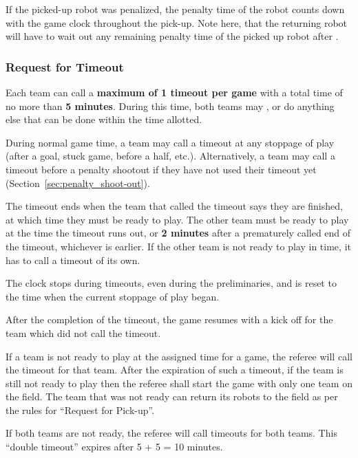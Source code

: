 If the picked-up robot was penalized, the penalty time of the robot counts down with the game clock throughout the pick-up.
Note here, that the returning robot will have to wait out any remaining penalty time of the picked up robot after .

\subsubsection{Request for Timeout}
\label{sec:request_for_timeout}
Each team can call a \textbf{maximum of 1 timeout per game} with a total time of no more than \textbf{5 minutes}. During this time, both teams may , or do anything else that can be done within the time allotted. \\

During normal game time, a team may call a timeout at any stoppage of play (after a goal, stuck game, before a half, etc.). Alternatively, a team may call a timeout before a penalty shootout if they have not used their timeout yet (\cf Section~\ref{sec:penalty_shoot-out}).

The timeout ends when the team that called the timeout says they are finished, at which time they must be ready to play. The other team must be ready to play at the time the timeout runs out, or \textbf{2 minutes} after a prematurely called end of the timeout, whichever is earlier. If the other team is not ready to play in time, it has to call a timeout of its own.

The clock stops during timeouts, even during the preliminaries, and is reset to the time when the current stoppage of play began.

After the completion of the timeout, the game resumes with a kick off for the team which did not call the timeout.

If a team is not ready to play at the assigned time for a game, the referee will call the timeout for that team. After the expiration of such a timeout, if the team is still not ready to play then the referee shall start the game with only one team on the field.  The team that was not ready can return its robots to the field as per the rules for ``Request for Pick-up''. 

If both teams are not ready, the referee will call timeouts for both teams. This ``double timeout'' expires after 5 + 5 = 10 minutes.

